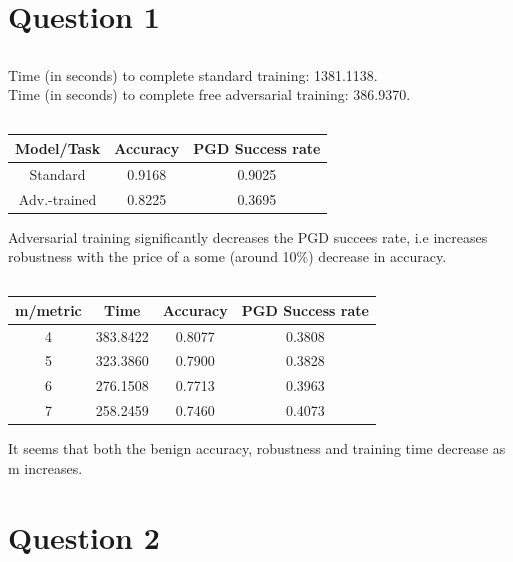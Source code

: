 \documentclass{article}
\begin{document}
\section{Question 1}
\setcounter{subsection}{2}
\subsection{}
Time (in seconds) to complete standard training: 1381.1138. \\
Time (in seconds) to complete free adversarial training: 386.9370.
\subsection{}
\begin{center}
\begin{tabular}{||c c c||} 
    \hline
    Model/Task & Accuracy & PGD Success rate \\ [0.5ex] 
    \hline\hline
    Standard & 0.9168 & 0.9025 \\ 
    \hline
    Adv.-trained & 0.8225 & 0.3695 \\
    \hline 
\end{tabular}
\end{center}
Adversarial training significantly decreases the PGD succees rate, i.e increases robustness with the price of a some (around 10\%) decrease in accuracy.
\subsection{}
\begin{center}
\begin{tabular}{||c c c c||} 
    \hline
    m/metric & Time & Accuracy & PGD Success rate \\ [0.5ex] 
    \hline\hline
    4 & 383.8422 & 0.8077 & 0.3808 \\ 
    \hline
    5 & 323.3860 & 0.7900 & 0.3828 \\
    \hline
    6 & 276.1508 & 0.7713 & 0.3963 \\
    \hline
    7 & 258.2459 & 0.7460 & 0.4073 \\
    \hline 
\end{tabular}
\end{center}
It seems that both the benign accuracy, robustness and training time decrease as m increases.
\section{Question 2}
\setcounter{subsection}{1}
\end{document}
